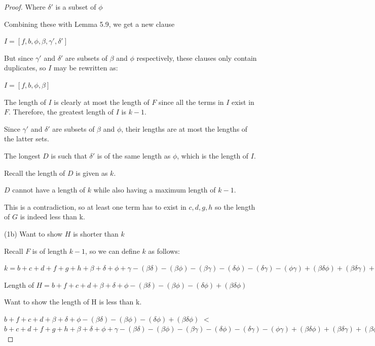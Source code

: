 \documentclass[manuscript]{acmart}
\begin{document}
\begin{proof}
        Where $\delta'$ is a subset of $\phi$

        Combining these with Lemma 5.9, we get a new clause

        $I = [f, b, \phi, \beta, \gamma', \delta']$

        But since $\gamma'$ and $\delta'$ are subsets of $\beta$ and
        $\phi$ respectively, these clauses only contain duplicates, so
        $I$ may be rewritten as:

        $I = [f, b, \phi, \beta]$

        The length of $I$ is clearly at most the length of $F$ since
        all the terms in $I$ exist in $F$. Therefore, the greatest length
        of $I$ is $k-1$. 
        
        Since $\gamma'$ and $\delta'$ are subsets of $\beta$ and $\phi$, 
        their lengths are at most the lengths of the latter sets.

        The longest $D$ is such that $\delta'$ is of the same length as
        $\phi$, which is the length of $I$.
        
        Recall the length of $D$ is given as $k$.

        $D$ cannot have a length of $k$ while also having a maximum length
        of $k - 1$.

        This is a contradiction, so at least one term has to exist in {$c, d, g, h$}
        so the length of $G$ is indeed less than k.

        (1b) Want to show $H$ is shorter than $k$

        Recall $F$ is of length $k - 1$, so we can define $k$ as follows:

        $k = b + c + d + f + g + h 
        + \beta + \delta + \phi + \gamma
        - (\beta \delta) - (\beta \phi) - (\beta \gamma) - (\delta \phi) - (\delta \gamma) - (\phi \gamma)
        + (\beta \delta \phi) + (\beta \delta \gamma) + (\beta \phi \gamma) + (\delta \phi \gamma)
        - (\beta \delta \phi \gamma)
        + 1
        $

        Length of $H = b + f + c + d 
        + \beta + \delta + \phi
        - (\beta \delta) - (\beta \phi) - (\delta \phi)
        + (\beta \delta \phi) $

        Want to show the length of H is less than k.

        $b + f + c + d 
        + \beta + \delta + \phi
        - (\beta \delta) - (\beta \phi) - (\delta \phi)
        + (\beta \delta \phi) $
        $<$
        $b + c + d + f + g + h 
        + \beta + \delta + \phi + \gamma
        - (\beta \delta) - (\beta \phi) - (\beta \gamma) - (\delta \phi) - (\delta \gamma) - (\phi \gamma)
        + (\beta \delta \phi) + (\beta \delta \gamma) + (\beta \phi \gamma) + (\delta \phi \gamma)
        - (\beta \delta \phi \gamma)
        + 1
        $


\end{proof}
\end{document}

